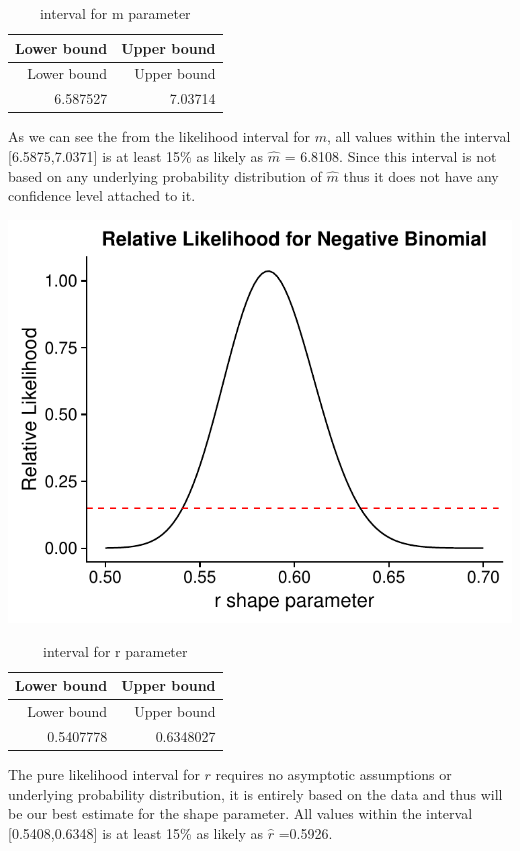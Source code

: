 \documentclass[11pt,preprint, authoryear]{elsarticle}
\numberwithin{equation}{section}
\numberwithin{figure}{section}
\numberwithin{table}{section}
\begin{document}
\begin{longtable}[]{@{}rr@{}}
\caption{interval for m parameter}\tabularnewline
\toprule
Lower bound & Upper bound\tabularnewline
\midrule
\endfirsthead
\toprule
Lower bound & Upper bound\tabularnewline
\midrule
\endhead
6.587527 & 7.03714\tabularnewline
\bottomrule
\end{longtable}

As we can see the from the likelihood interval for \(m\), all values
within the interval {[}6.5875,7.0371{]} is at least 15\% as likely as
\(\hat{m}\) = 6.8108. Since this interval is not based on any underlying
probability distribution of \(\hat{m}\) thus it does not have any
confidence level attached to it.

\includegraphics{likelihood_files/figure-latex/unnamed-chunk-9-1.pdf}

\begin{longtable}[]{@{}rr@{}}
\caption{interval for r parameter}\tabularnewline
\toprule
Lower bound & Upper bound\tabularnewline
\midrule
\endfirsthead
\toprule
Lower bound & Upper bound\tabularnewline
\midrule
\endhead
0.5407778 & 0.6348027\tabularnewline
\bottomrule
\end{longtable}

The pure likelihood interval for \(r\) requires no asymptotic
assumptions or underlying probability distribution, it is entirely based
on the data and thus will be our best estimate for the shape parameter.
All values within the interval {[}0.5408,0.6348{]} is at least 15\% as
likely as \(\hat{r}\) =0.5926.
\end{document}
